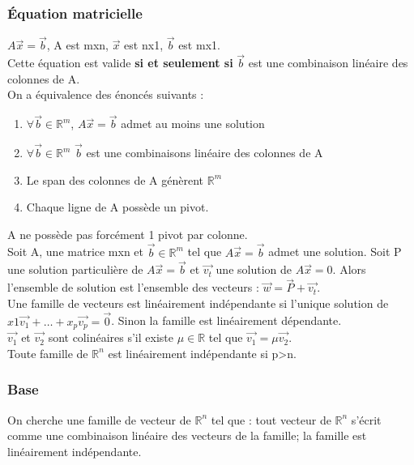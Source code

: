 \documentclass[../main.tex]{subfiles}
\begin{document}
\subsubsection{Équation matricielle}
$A\vec{x} = \vec{b}$, A est mxn, $\vec{x}$ est nx1, $\vec{b}$ est mx1.\\
Cette équation est valide \textbf{si et seulement si} $\vec{b}$ est une combinaison linéaire des colonnes de A.\\
On a équivalence des énoncés suivants :
\begin{enumerate}
    \item $\forall \vec{b} \in \mathbb{R}^m$, $A\vec{x} = \vec{b}$ admet au moins une solution\\
    \item $\forall \vec{b} \in \mathbb{R}^m$ $\vec{b}$ est une combinaisons linéaire des colonnes de A\\
    \item Le span des colonnes de A génèrent $\mathbb{R}^m$\\
    \item Chaque ligne de A possède un pivot.
\end{enumerate}
\warning A ne possède pas forcément 1 pivot par colonne.\\

Soit A, une matrice mxn et $\vec{b} \in \mathbb{R}^m$ tel que $A\vec{x} = \vec{b}$ admet une solution. Soit P une solution particulière de $A\vec{x} = \vec{b}$ et $\vec{v_t}$ une solution de $A\vec{x} = 0$. Alors l'ensemble de solution est l'ensemble des vecteurs : $\vec{w} = \vec{P} + \vec{v_t}$.\\

Une famille de vecteurs est linéairement indépendante si l'unique solution de $x1\vec{v_1} + \dots + x_p \vec{v_p} = \vec{0}$. Sinon la famille est linéairement dépendante.\\

$\vec{v_1}$ et $\vec{v_2}$ sont colinéaires s'il existe $\mu \in \mathbb{R}$ tel que $\vec{v_1} = \mu \vec{v_2}$.\\

Toute famille de $\mathbb{R}^n$ est linéairement indépendante si p>n. \\


\subsubsection{Base}
On cherche une famille de vecteur de $\mathbb{R}^n$ tel que : tout vecteur de $\mathbb{R}^n$ s'écrit comme une combinaison linéaire des vecteurs de la famille; la famille est linéairement indépendante.\\
\end{document}
